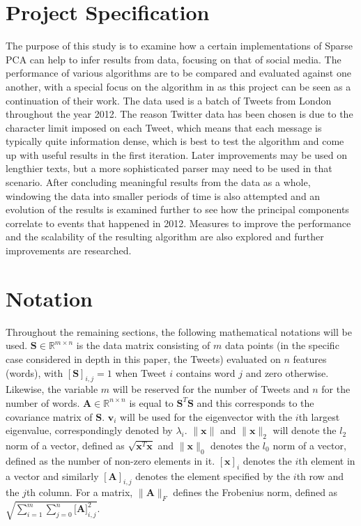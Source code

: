 \documentclass[11pt,a4paper]{article}
\begin{document}

\section{Project Specification}

The purpose of this study is to examine how a certain implementations of Sparse PCA can help to infer results from data, focusing on that of social media. The performance of various algorithms are to be compared and evaluated against one another, with a special focus on the algorithm in \cite{dimakis} as this project can be seen as a continuation of their work. The data used is a batch of Tweets from London throughout the year 2012. The reason Twitter data has been chosen is due to the character limit imposed on each Tweet, which means that each message is typically quite information dense, which is best to test the algorithm and come up with useful results in the first iteration. Later improvements may be used on lengthier texts, but a more sophisticated parser may need to be used in that scenario. After concluding meaningful results from the data as a whole, windowing the data into smaller periods of time is also attempted and an evolution of the results is examined further to see how the principal components correlate to events that happened in 2012. Measures to improve the performance and the scalability of the resulting algorithm are also explored and further improvements are researched.

\section{Notation}

Throughout the remaining sections, the following mathematical notations will be used. $\mathbf{S} \in \mathbb{R}^{m\times n}$ is the data matrix consisting of $m$ data points (in the specific case considered in depth in this paper, the Tweets) evaluated on $n$ features (words), with $[\mathbf{S}]_{i,j} = 1$ when Tweet $i$ contains word $j$ and zero otherwise. Likewise, the variable $m$ will be reserved for the number of Tweets and $n$ for the number of words. $\mathbf{A} \in \mathbb{R}^{n \times n}$ is equal to $\mathbf{S}^T\mathbf{S}$ and this corresponds to the covariance matrix of $\mathbf{S}$. $\mathbf{v}_i$ will be used for the eigenvector with the $i$th largest eigenvalue, correspondingly denoted by $\lambda_i$. $\|\mathbf{x}\|$ and $\|\mathbf{x}\|_2$ will denote the $l_2$ norm of a vector, defined as $\sqrt{\mathbf{x}^T\mathbf{x}}$ and $\|\mathbf{x}\|_0$ denotes the $l_0$ norm of a vector, defined as the number of non-zero elements in it. $[\mathbf{x} ]_i$ denotes the $i$th element in a vector and similarly $[\mathbf{A}]_{i, j}$ denotes the element specified by the $i$th row and the $j$th column. For a matrix, $\|\mathbf{A}\|_F$ defines the Frobenius norm, defined as $\sqrt{\sum^m_{i=1}{\sum_{j=0}^n{\mathbf{[A}]_{i, j}^2}}}$.
\end{document}
